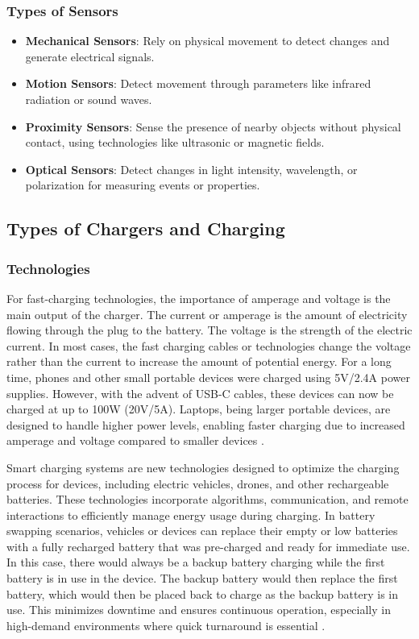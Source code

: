 \subsubsection{Types of Sensors}
\begin{itemize}
    \item \textbf{Mechanical Sensors}: Rely on physical movement to detect changes and generate electrical signals.
    \item \textbf{Motion Sensors}: Detect movement through parameters like infrared radiation or sound waves.
    \item \textbf{Proximity Sensors}: Sense the presence of nearby objects without physical contact, using technologies like ultrasonic or magnetic fields.
    \item \textbf{Optical Sensors}: Detect changes in light intensity, wavelength, or polarization for measuring events or properties.
\end{itemize}

\subsection{Types of Chargers and Charging}
\subsubsection{Technologies}
For fast-charging technologies, the importance of amperage and voltage is the main output of the charger. The current or amperage is the amount of electricity flowing through the plug to the battery. The voltage is the strength of the electric current. In most cases, the fast charging cables or technologies change the voltage rather than the current to increase the amount of potential energy. For a long time, phones and other small portable devices were charged using 5V/2.4A power supplies. However, with the advent of USB-C cables, these devices can now be charged at up to 100W (20V/5A). Laptops, being larger portable devices, are designed to handle higher power levels, enabling faster charging due to increased amperage and voltage compared to smaller devices \cite{fastchargers}.

Smart charging systems are new technologies designed to optimize the charging process for devices, including electric vehicles, drones, and other rechargeable batteries. These technologies incorporate algorithms, communication, and remote interactions to efficiently manage energy usage during charging. In battery swapping scenarios, vehicles or devices can replace their empty or low batteries with a fully recharged battery that was pre-charged and ready for immediate use. In this case, there would always be a backup battery charging while the first battery is in use in the device. The backup battery would then replace the first battery, which would then be placed back to charge as the backup battery is in use. This minimizes downtime and ensures continuous operation, especially in high-demand environments where quick turnaround is essential \cite{vehiclessmartcharge}.

